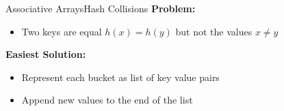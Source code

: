 
\begin{frame}{Associative Arrays}{Hash Collisions}
  \textbf{Problem:}
  \begin{itemize}
    \item
      Two keys are equal $h(x) = h(y)$ but not the values $x \neq y$
  \end{itemize}
  \textbf{Easiest Solution:}
  \begin{itemize}
    \item
      Represent each bucket as list of key value pairs
    \item
      Append new values to the end of the list
  \end{itemize}
\end{frame}


